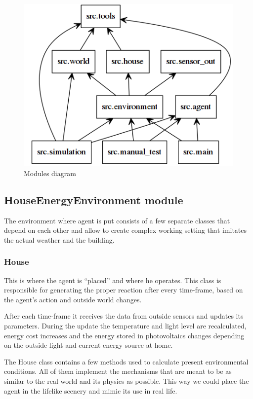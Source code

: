 \documentclass{article}
\begin{document}
\begin{figure}[H]
    \begin{center}
        \includegraphics[scale=0.5]{packages.png}
        \caption{Modules diagram}
    \end{center}
\end{figure}

\subsection{HouseEnergyEnvironment module}
The environment where agent is put consists of a few separate classes that depend on each other and allow to create complex working setting that imitates the actual weather and the building.
\subsubsection{House}
This is where the agent is “placed” and where he operates. This class is responsible for generating the proper reaction after every time-frame, based on the agent’s action and outside world changes.

After each time-frame it receives the data from outside sensors and updates its parameters. During the update the temperature and light level are recalculated, energy cost increases and the energy stored in photovoltaics changes depending on the outside light and current energy source at home.

The House class contains a few methods used to calculate present environmental conditions. All of them implement the mechanisms that are meant to be as similar to the real world and its physics as possible. This way we could place the agent in the lifelike scenery and mimic its use in real life.
\end{document}
